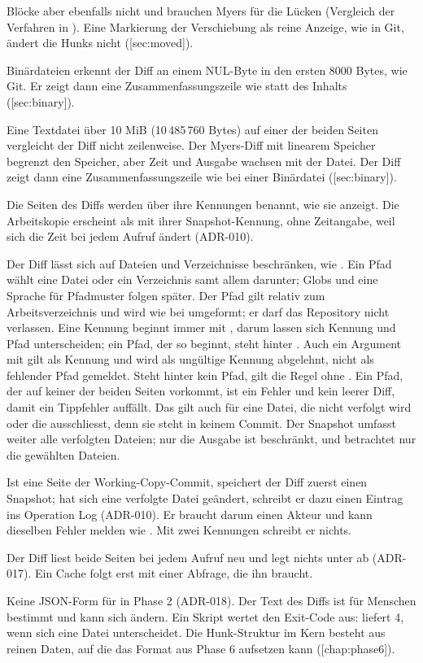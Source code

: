 Blöcke aber ebenfalls nicht und brauchen Myers für die Lücken
(Vergleich der Verfahren in ).
Eine Markierung der Verschiebung als reine Anzeige, wie  in Git,
ändert die Hunks nicht ([sec:moved]).
\item Binärdateien erkennt der Diff an einem NUL-Byte in den ersten 8000 Bytes, wie Git. Er zeigt
dann eine Zusammenfassungszeile wie  statt des Inhalts
([sec:binary]).
\item Eine Textdatei über 10 MiB (10\,485\,760 Bytes) auf einer der beiden Seiten vergleicht der
Diff nicht zeilenweise.
Der Myers-Diff mit linearem Speicher begrenzt den Speicher, aber Zeit und Ausgabe
wachsen mit der Datei. Der Diff zeigt dann eine Zusammenfassungszeile wie bei einer Binärdatei
([sec:binary]).
\item Die Seiten des Diffs werden über ihre Kennungen benannt, wie  sie
anzeigt. Die Arbeitskopie erscheint als  mit ihrer Snapshot-Kennung,
ohne Zeitangabe, weil sich die Zeit bei jedem Aufruf ändert (ADR-010).
\item Der Diff lässt sich auf Dateien und Verzeichnisse beschränken, wie .
Ein Pfad wählt eine Datei oder ein Verzeichnis samt allem darunter; Globs und eine Sprache für
Pfadmuster folgen später. Der Pfad gilt relativ zum Arbeitsverzeichnis und wird wie bei
 umgeformt; er darf das Repository nicht verlassen. Eine Kennung beginnt immer mit
, darum lassen sich Kennung und Pfad unterscheiden; ein Pfad, der so beginnt,
steht hinter \type{--}. Auch ein Argument mit  gilt als Kennung und wird als ungültige
Kennung abgelehnt, nicht als fehlender Pfad gemeldet.
Steht hinter \type{--} kein Pfad, gilt die Regel ohne \type{--}.
Ein Pfad, der auf keiner der beiden Seiten vorkommt, ist ein Fehler und kein leerer Diff,
damit ein Tippfehler auffällt. Das gilt auch für eine Datei,
die nicht verfolgt wird oder die  ausschliesst,
denn sie steht in keinem Commit. Der Snapshot
umfasst weiter alle verfolgten Dateien; nur die Ausgabe ist beschränkt, und
 betrachtet nur die gewählten Dateien.
\item Ist eine Seite der Working-Copy-Commit, speichert der Diff zuerst einen Snapshot;
hat sich eine verfolgte Datei geändert, schreibt er dazu einen Eintrag ins Operation Log
(ADR-010). Er braucht darum einen Akteur und kann
dieselben Fehler melden wie . Mit zwei Kennungen schreibt er nichts.
\item Der Diff liest beide Seiten bei jedem Aufruf neu und legt nichts unter
 ab (ADR-017). Ein Cache folgt erst mit einer Abfrage, die ihn braucht.
\item Keine JSON-Form für  in Phase 2 (ADR-018). Der Text des Diffs ist für Menschen
bestimmt und kann sich ändern. Ein Skript wertet den Exit-Code aus:  liefert 4,
wenn sich eine Datei unterscheidet. Die Hunk-Struktur im Kern besteht aus reinen Daten, auf die
das Format aus Phase 6 aufsetzen kann ([chap:phase6]).
\stopitemize

